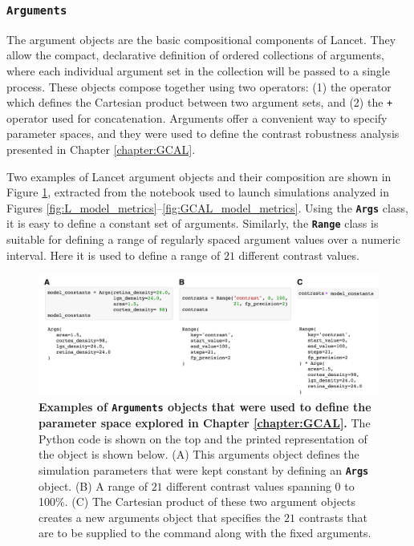 \documentclass[phd,ianc,twoside]{infthesis}
\newcommand{\tbf}[1]{\texttt{\textbf{#1}}}
\begin{document}
\subsubsection*{\tbf{Arguments}}

The argument objects are the basic compositional components of
Lancet. They allow the compact, declarative definition of ordered
collections of arguments, where each individual argument set in the
collection will be passed to a single process. These objects compose
together using two operators: (1) the {\tt *} operator which defines the
Cartesian product between two argument sets, and (2) the {\tt +} operator
used for concatenation. Arguments offer a convenient way to specify
parameter spaces, and they were used to define the contrast robustness
analysis presented in Chapter \ref{chapter:GCAL}.

Two examples of Lancet argument objects and their composition are shown
in Figure \ref{fig:lancet_args}, extracted from the notebook used to
launch simulations analyzed in Figures
\ref{fig:L_model_metrics}--\ref{fig:GCAL_model_metrics}. Using the
\tbf{Args} class, it is easy to define a constant set of
arguments. Similarly, the \tbf{Range} class is suitable for defining a
range of regularly spaced argument values over a numeric interval. Here
it is used to define a range of $21$ different contrast values.

\begin{figure}
  \center
\includegraphics[width=1\textwidth]{./figures/Lancet_Args.pdf}
\caption{{\bf Examples of \tbf{Arguments} objects that were used to
    define the parameter space explored in Chapter \ref{chapter:GCAL}.}
  The Python code is shown on the top and the printed representation of
  the object is shown below. (A) This arguments object defines the
  simulation parameters that were kept constant by defining an
  \tbf{Args} object.  (B) A range of $21$ different contrast values
  spanning 0 to 100\%. (C) The Cartesian product of these two argument
  objects creates a new arguments object that specifies the $21$
  contrasts that are to be supplied to the command along with the fixed
  arguments.}
\label{fig:lancet_args}
\end{figure}
\end{document}
